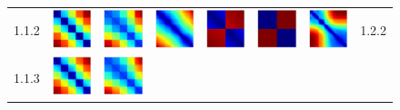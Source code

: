 \documentclass[bachelor, nocolorlinks, printoneside]{seuthesis} %
\begin{document}
\begin{Main}
\begin{figure}[ht!]
\begin{centering}
\begin{tabular}{cccc|cccc}
        1.1.2 &\includegraphics[width=0.12\columnwidth,keepaspectratio]{figs/toyset_matrices/cluster_5by20_2_1.png} &
        \includegraphics[width=0.12\columnwidth,keepaspectratio]{figs/toyset_matrices/cluster_5by20_2_2.png} &
        \includegraphics[width=0.12\columnwidth,keepaspectratio]{figs/toyset_matrices/cluster_5by20_2_3.png} &  
        \includegraphics[width=0.12\columnwidth,keepaspectratio]{figs/toyset_matrices/cluster_2by10_2_1.png} &
        \includegraphics[width=0.12\columnwidth,keepaspectratio]{figs/toyset_matrices/cluster_2by10_2_2.png} &
        \includegraphics[width=0.12\columnwidth,keepaspectratio]{figs/toyset_matrices/cluster_2by10_2_3.png}& 1.2.2\\
        1.1.3 &\includegraphics[width=0.12\columnwidth,keepaspectratio]{figs/toyset_matrices/cluster_5by20_3_1.png} &
        \includegraphics[width=0.12\columnwidth,keepaspectratio]{figs/toyset_matrices/cluster_5by20_3_2.png} &

\end{tabular}
\end{centering}
\end{figure}
\end{Main}
\end{document}

